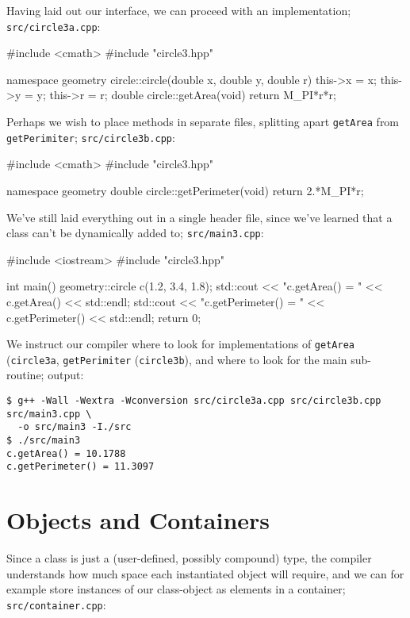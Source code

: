 \documentclass[12pt,letterpaper,twoside]{article}
\begin{document}
Having laid out our interface, we can proceed with an implementation;
\texttt{src/circle3a.cpp}:

\begin{cpp}
#include <cmath>
#include "circle3.hpp"

namespace geometry {
  circle::circle(double x, double y, double r) {
    this->x = x;
    this->y = y;
    this->r = r;
  }
  double circle::getArea(void) {
    return M_PI*r*r;
  }
}

\end{cpp}

Perhaps we wish to place methods in separate files, splitting apart \texttt{getArea} from \texttt{getPerimiter};
\texttt{src/circle3b.cpp}:

\begin{cpp}
#include <cmath>
#include "circle3.hpp"

namespace geometry {
  double circle::getPerimeter(void) {
    return 2.*M_PI*r;
  }
}
\end{cpp}

We've still laid everything out in a single header file, since we've learned 
that a class can't be dynamically added to;
\texttt{src/main3.cpp}:

\begin{cpp}
#include <iostream>
#include "circle3.hpp"

int main() {
  geometry::circle c(1.2, 3.4, 1.8);
  std::cout << "c.getArea() = " << c.getArea() << std::endl;
  std::cout << "c.getPerimeter() = " << c.getPerimeter() << std::endl;
  return 0;
}
\end{cpp}

We instruct our compiler where to look for implementations of 
\texttt{getArea} (\texttt{circle3a}, \texttt{getPerimiter} 
(\texttt{circle3b}), and where to look for the main sub-routine; output:

\begin{verbatim}
$ g++ -Wall -Wextra -Wconversion src/circle3a.cpp src/circle3b.cpp src/main3.cpp \
  -o src/main3 -I./src
$ ./src/main3
c.getArea() = 10.1788
c.getPerimeter() = 11.3097
\end{verbatim}

\section{Objects and Containers}
Since a class is just a (user-defined, possibly compound) type, the compiler
understands how much space each instantiated object will require, and we can
for example store instances of our class-object as elements in a container;
\texttt{src/container.cpp}:
\end{document}
